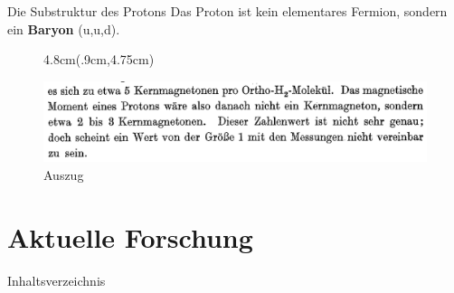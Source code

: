\documentclass[t,9pt]{beamer}
\newcommand{\highlight}[3]{ \begin{textblock*}{#1}(#2,#3) \begin{tcolorbox} [enhanced,opacityfill=.1,colback=blue] \end{tcolorbox} \end{textblock*} } %
\begin{document}
        \begin{frame}{Die Substruktur des Protons}
                Das Proton ist kein elementares Fermion, sondern ein \textbf{Baryon} (u,u,d).
                \begin{center}
                \end{center}
                \tiny\vspace{-.2cm}\hspace{8cm}\cite{CODATA_proton_magneton}\normalsize
                \begin{figure}
                        \highlight{4.8cm}{.9cm}{4.75cm}
                        \includegraphics[width=.9\textwidth]{prosi_mag_moment_proton_nicht_1.png}
                        \caption*{Auszug \cite{FrischStern1933}}
                \end{figure}
        \end{frame}

        \section{Aktuelle Forschung}

        \begin{frame}{Inhaltsverzeichnis}
                \tableofcontents[currentsection]
        \end{frame}
\end{document}
